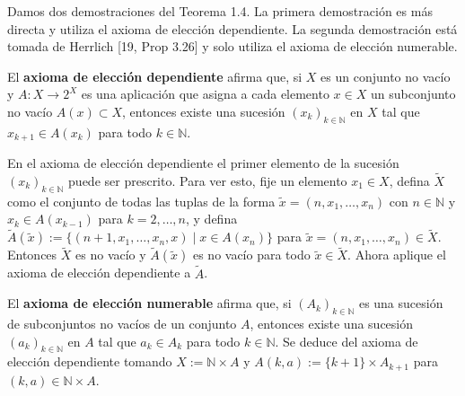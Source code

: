 Damos dos demostraciones del Teorema 1.4. La primera demostración es más directa y utiliza el axioma de elección dependiente. La segunda demostración está tomada de Herrlich [19, Prop 3.26] y solo utiliza el axioma de elección numerable.

El \textbf{axioma de elección dependiente} afirma que, si $X$ es un conjunto no vacío y $A:X\rightarrow 2^{X}$ es una aplicación que asigna a cada elemento $x\in X$ un subconjunto no vacío $A(x)\subset X$, entonces existe una sucesión $(x_{k})_{k\in\mathbb{N}}$ en $X$ tal que $x_{k+1}\in A(x_{k})$ para todo $k\in\mathbb{N}$.

En el axioma de elección dependiente el primer elemento de la sucesión $(x_{k})_{k\in\mathbb{N}}$ puede ser prescrito. Para ver esto, fije un elemento $x_{1}\in X$, defina $\tilde{X}$ como el conjunto de todas las tuplas de la forma $\tilde{x}=(n,x_{1},\dots,x_{n})$ con $n\in\mathbb{N}$ y $x_{k}\in A(x_{k-1})$ para $k=2,\dots,n$, y defina $\tilde{A}(\tilde{x}) := \{(n+1,x_{1},\dots,x_{n},x) \mid x\in A(x_{n})\}$ para $\tilde{x}=(n,x_{1},\dots,x_{n})\in\tilde{X}$. Entonces $\tilde{X}$ es no vacío y $\tilde{A}(\tilde{x})$ es no vacío para todo $\tilde{x}\in\tilde{X}$. Ahora aplique el axioma de elección dependiente a $\tilde{A}$.

El \textbf{axioma de elección numerable} afirma que, si $(A_{k})_{k\in\mathbb{N}}$ es una sucesión de subconjuntos no vacíos de un conjunto $A$, entonces existe una sucesión $(a_{k})_{k\in\mathbb{N}}$ en $A$ tal que $a_{k}\in A_{k}$ para todo $k\in\mathbb{N}$. Se deduce del axioma de elección dependiente tomando $X:=\mathbb{N}\times A$ y $A(k,a):=\{k+1\}\times A_{k+1}$ para $(k,a)\in\mathbb{N}\times A$.

